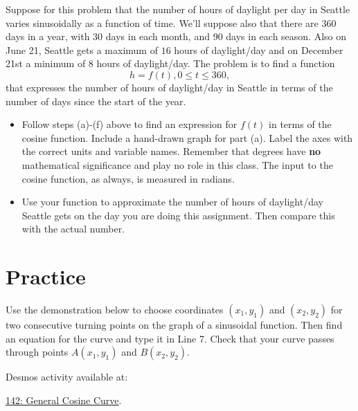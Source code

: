 \documentclass{ximera}
\begin{document}
\begin{question}  \label{Qdsg77jhre}
Suppose for this problem that the number of hours of daylight per day in Seattle varies sinusoidally as a function of time. We'll suppose also that there are 360 days in a year, with 30 days in each month, and 90 days in each season. Also on June 21, Seattle gets a maximum of $16$ hours of daylight/day and on December 21st a minimum of $8$ hours of daylight/day. The problem is to find a function 
\[
  h = f(t) , 0\leq t \leq 360 ,
\]
that expresses the number of hours of daylight/day in Seattle in terms of the number of days since the start of the year. 

\begin{itemize}
\item{Follow steps (a)-(f) above to find an expression for $f(t)$ in terms of the cosine function. Include a hand-drawn graph for part (a). Label the axes with the correct units and variable names. Remember that degrees have {\bf no} mathematical significance and play no role in this class. The input to the cosine function, as always, is measured in radians.}

\item{Use your function to approximate the number of hours of daylight/day Seattle gets on the day you are doing this assignment. Then compare this with the actual number.}
\end{itemize}
\end{question}


\section{Practice}

\begin{exploration}   \label{Edsgtjnh}
Use the demonstration below to choose coordinates $(x_1, y_1)$ and $(x_2,y_2)$ for two consecutive turning points on the graph of a sinusoidal function. Then find an equation for the curve and type it in Line 7. Check that your curve passes through points $A(x_1, y_1)$ and $B(x_2, y_2)$.

Desmos activity available at:

\href{https://www.desmos.com/calculator/og4ffxtbnx}{142: General Cosine Curve}.

 
\begin{onlineOnly}
    \begin{center}
\end{center}
\end{onlineOnly}

\end{exploration}
\end{document}
